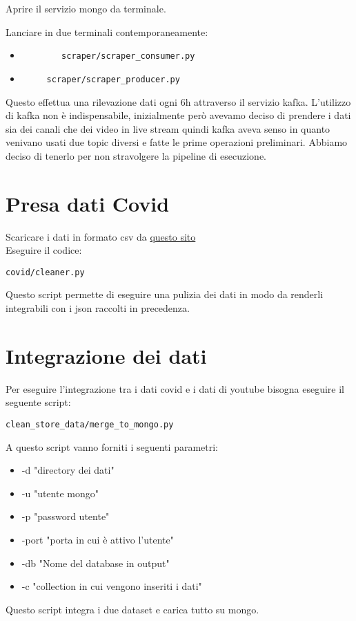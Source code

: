 \documentclass[10pt, a4paper,openany]{article}
\begin{document}
Aprire il servizio mongo da terminale.


Lanciare in due terminali contemporaneamente: 

\begin{itemize}
	\item \begin{verbatim}
		scraper/scraper_consumer.py
	\end{verbatim}
	\item \begin{verbatim}
	 scraper/scraper_producer.py
	\end{verbatim}
\end{itemize}

Questo effettua una rilevazione dati ogni 6h attraverso il servizio kafka. L'utilizzo di kafka non è indispensabile, inizialmente però avevamo deciso di prendere i dati sia dei canali che dei video in live stream quindi kafka aveva senso in quanto venivano usati due topic diversi e fatte le prime operazioni preliminari. Abbiamo deciso di tenerlo per non stravolgere la pipeline di esecuzione.

\section*{Presa dati Covid}

Scaricare i dati in formato csv da \href{https://ourworldindata.org/coronavirus-testing}{questo sito}
\\Eseguire il codice:

\begin{verbatim}
covid/cleaner.py
\end{verbatim}
Questo script permette di eseguire una pulizia dei dati in modo da renderli integrabili con i json raccolti in precedenza.


\section*{Integrazione dei dati}


Per eseguire l'integrazione tra i dati covid e i dati di youtube bisogna eseguire il seguente script:

\begin{verbatim}
clean_store_data/merge_to_mongo.py
\end{verbatim}
A questo script vanno forniti i seguenti parametri:

\begin{itemize}
	\item -d "directory dei dati"
	\item -u "utente mongo"
	\item -p "password utente"
	\item -port "porta in cui è attivo l'utente"
	\item-db "Nome del database in output"
	\item -c "collection in cui vengono inseriti i dati"
\end{itemize}
Questo script integra i due dataset e carica tutto su mongo.
\end{document}
